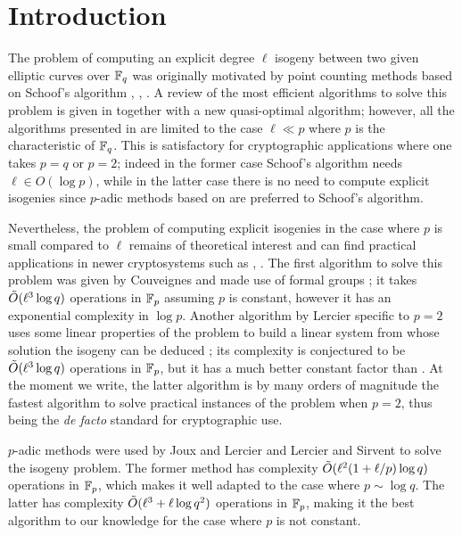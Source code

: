 \section{Introduction}

The problem of computing an explicit degree $\ell$ isogeny between two
given elliptic curves over $\mathbb{F}_q$ was originally motivated by point
counting methods based on Schoof's algorithm \cite{Atk91},
\cite{Elk91}, \cite{Sch95}. A review of the most efficient algorithms
to solve this problem is given in \cite{BoMoSaSc08} together with a
new quasi-optimal algorithm; however, all the algorithms presented in
\cite{BoMoSaSc08} are limited to the case $\ell\ll p$ where $p$ is the
characteristic of $\mathbb{F}_q$. This is satisfactory for cryptographic
applications where one takes $p=q$ or $p=2$; indeed in the former case
Schoof's algorithm needs $\ell\in O(\log p)$, while in the latter case
there is no need to compute explicit isogenies since $p$-adic methods
based on \cite{Sat00} are preferred to Schoof's algorithm.

Nevertheless, the problem of computing explicit isogenies in the case
where $p$ is small compared to $\ell$ remains of theoretical interest
and can find practical applications in newer cryptosystems such as
\cite{Tes06}, \cite{RoSt06}. The first algorithm to solve this problem
was given by Couveignes and made use of formal groups \cite{Cou94}; it
takes $\tilde{O}(\ell^3\log q)$ operations in $\mathbb{F}_p$ assuming $p$ is
constant, however it has an exponential complexity in $\log
p$. Another algorithm by Lercier specific to $p=2$ uses some linear
properties of the problem to build a linear system from whose solution
the isogeny can be deduced \cite{Ler96}; its complexity is conjectured
to be $\tilde{O}(\ell^3\log q)$ operations in $\mathbb{F}_p$, but it has a much
better constant factor than \cite{Cou94}. At the moment we write, the
latter algorithm is by many orders of magnitude the fastest algorithm
to solve practical instances of the problem when $p=2$, thus being the
\emph{de facto} standard for cryptographic use.

$p$-adic methods were used by Joux and Lercier \cite{JL06} and Lercier
and Sirvent \cite{LeSi09} to solve the isogeny problem. The former
method has complexity $\tilde{O}(\ell^2(1 + \ell/p)\log q)$ operations in
$\mathbb{F}_p$, which makes it well adapted to the case where $p\sim\log
q$. The latter has complexity $\tilde{O}(\ell^3 + \ell\log q^2)$
operations in $\mathbb{F}_p$, making it the best algorithm to our knowledge
for the case where $p$ is not constant.

